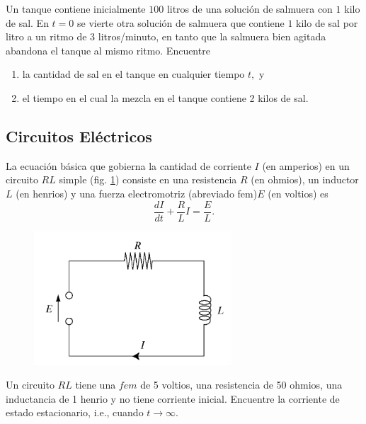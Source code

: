 	\begin{problema}
		\label{bron:exmp:7.17}
		Un tanque contiene inicialmente $100$ litros de una solución de salmuera con $1$ kilo de sal. En $t=0$ se vierte otra solución de salmuera que contiene $1$ kilo de sal por litro a un ritmo de $3$ litros/minuto, en tanto que la salmuera bien agitada abandona el tanque al mismo ritmo. Encuentre
		\begin{enumerate}
			\item la cantidad de sal en el tanque en cualquier tiempo $t,$ y
			\item el tiempo en el cual la mezcla en el tanque contiene 2 kilos de sal.
		\end{enumerate}

	\end{problema}







\subsection{Circuitos Eléctricos}


	La ecuación básica que gobierna la cantidad de corriente $I$ (en amperios) en un circuito $RL$ simple (fig. \ref{fig:020502}) consiste en una resistencia $R$ (en ohmios), un inductor $L$ (en henrios) y una fuerza electromotriz (abreviado fem)$E$ (en voltios) es
	\[
		\label{bron:7.9}
		\dfrac{dI}{dt}+\dfrac{R}{L}I=\dfrac{E}{L}.
	\]




	\begin{figure}
		\centering
		\includegraphics[height=5cm,keepaspectratio=true]{./edo/img020502.png}
		\label{fig:020502}
	\end{figure}




	\begin{problema}
		Un circuito $RL$ tiene una $fem$ de 5 voltios, una resistencia de 50 ohmios, una inductancia de 1 henrio y no tiene corriente inicial. Encuentre la corriente de estado estacionario, i.e., cuando $t\to \infty.$
	\end{problema}




